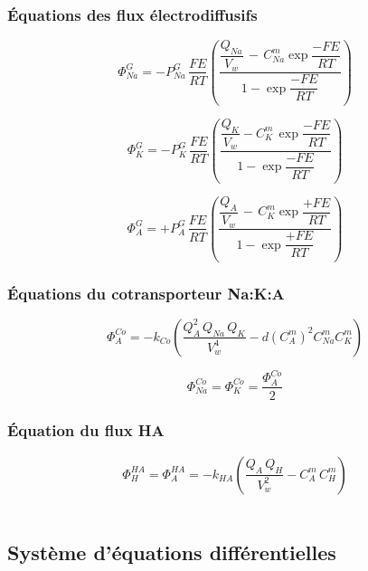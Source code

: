 \documentclass[a4paper,fleqn]{article}
\begin{document}
\subsubsection*{Équations des flux électrodiffusifs}

\begin{equation}
\Phi_{Na}^{G}=-P_{Na}^{G}\,\frac{FE}{RT}\left(\frac{\dfrac{Q_{Na}}{V_w}\,-\,{C_{Na}^{m}\exp{\dfrac{-FE}{RT}}}}{1 - \exp{\dfrac{-FE}{RT}}}\right)
\end{equation}

\begin{equation}
\Phi_{K}^{G}=-P_{K}^{G}\,\frac{FE}{RT}\left(\dfrac{\dfrac{Q_{K}}{V_w}-{C_{K}^{m}\,\exp{\dfrac{-FE}{RT}}}}{1 - \exp{\dfrac{-FE}{RT}}}\right)
\end{equation}

\begin{equation}
\Phi_{A}^{G}=+P_{A}^{G}\,\frac{FE}{RT}\left(\dfrac{\dfrac{Q_{A}}{V_w}\,-\,{C_{K}^{m}\exp{\dfrac{+FE}{RT}}}}{1 - \exp{\dfrac{+FE}{RT}}}\right)
\end{equation}

\subsubsection*{Équations du cotransporteur Na:K:A}

\begin{equation}
\Phi_{A}^{Co}=-k_{Co}\left(\frac{Q_{A}^2\,Q_{Na}\,Q_{K}}{V_w^4}-d\left(C_{A}^{m}\right)^2C_{Na}^{m}C_{K}^{m}\right)
\end{equation}

\begin{equation}
\Phi_{Na}^{Co}=\Phi_{K}^{Co}=\frac{\Phi_{A}^{Co}}{2}
\end{equation}

\subsubsection*{Équation du flux HA}

\begin{equation}
\Phi_{H}^{HA}=\Phi_{A}^{HA}=-k_{HA}( \frac{Q_A\,Q_H}{V_w^2} - C_{A}^{m}\,C_{H}^{m})
\end{equation}\\

\subsection{Système d'équations différentielles}
\end{document}
